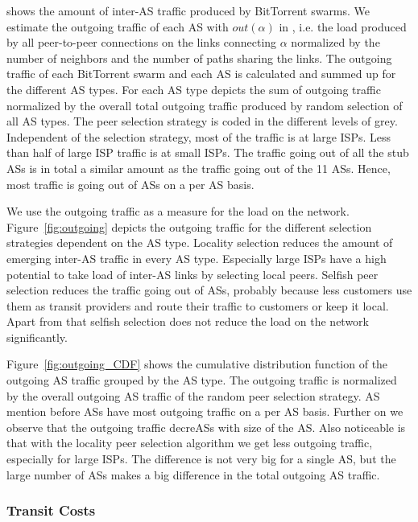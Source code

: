  shows the amount of inter-AS traffic produced by BitTorrent swarms. We estimate the outgoing traffic of each AS with $out(\alpha)$ in , i.e. the load produced by all peer-to-peer connections on the links connecting $\alpha$ normalized by the number of neighbors and the number of paths sharing the links. The outgoing traffic of each BitTorrent swarm and each AS is calculated and summed up for the different AS types. For each AS type  depicts the sum of outgoing traffic normalized by the overall total outgoing traffic produced by random selection of all AS types. The peer selection strategy is coded in the different levels of grey. Independent of the selection strategy, most of the traffic is at large ISPs. Less than half of large ISP traffic is at small ISPs. The traffic going out of all the stub ASs is in total a similar amount as the traffic going out of the 11 \tier ASs. Hence, most traffic is going out of \tier ASs on a per AS basis.

We use the outgoing traffic as a measure for the load on the network.
Figure~\ref{fig:outgoing} depicts the outgoing traffic for the different selection strategies dependent on the AS type. Locality selection reduces the amount of emerging inter-AS traffic in every AS type. Especially large ISPs have a high potential to take load of inter-AS links by selecting local peers. Selfish peer selection reduces the traffic going out of \tier ASs, probably because less customers use them as transit providers and route their traffic to customers or keep it local. Apart from that selfish selection does not reduce the load on the network significantly.

Figure~\ref{fig:outgoing_CDF} shows the cumulative distribution function of the outgoing AS traffic grouped by the AS type. The outgoing traffic is normalized by the overall outgoing AS traffic of the random peer selection strategy. AS mention before \tier ASs have most outgoing traffic on a per AS basis. Further on we observe that the outgoing traffic decreASs with size of the AS. Also noticeable is that with the locality peer selection algorithm we get less outgoing traffic, especially for large ISPs. The difference is not very big for a single AS, but the large number of ASs makes a big difference in the total outgoing AS traffic.

\subsubsection{Transit Costs}

